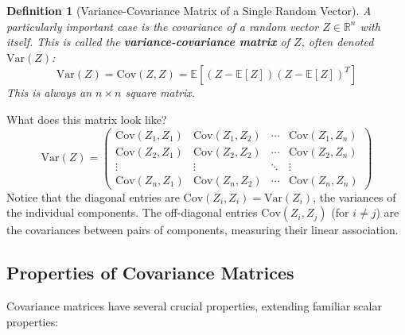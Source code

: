 \documentclass[11pt]{article}
\newtheorem{definition}[theorem]{Definition}
\theoremstyle{definition}
\newcommand{\R}{\mathbb{R}} %
\newcommand{\E}{\mathbb{E}} %
\newcommand{\Var}{\mathrm{Var}} %
\newcommand{\Cov}{\mathrm{Cov}} %
\newcommand{\T}{^T} %
\begin{document}
\begin{definition}[Variance-Covariance Matrix of a Single Random Vector]
\label{def:varcov_one_vector}
A particularly important case is the covariance of a random vector $Z \in \R^n$ with itself. This is called the \textbf{variance-covariance matrix} of $Z$, often denoted $\Var(Z)$:
\[
\Var(Z) = \Cov(Z, Z) = \E\left[ (Z - \E[Z]) (Z - \E[Z])\T \right]
\]
This is always an $n \times n$ square matrix.
\end{definition}

What does this matrix look like?
\[
\Var(Z) = \begin{pmatrix}
\Cov(Z_1, Z_1) & \Cov(Z_1, Z_2) & \cdots & \Cov(Z_1, Z_n) \\
\Cov(Z_2, Z_1) & \Cov(Z_2, Z_2) & \cdots & \Cov(Z_2, Z_n) \\
\vdots & \vdots & \ddots & \vdots \\
\Cov(Z_n, Z_1) & \Cov(Z_n, Z_2) & \cdots & \Cov(Z_n, Z_n)
\end{pmatrix}
\]
Notice that the diagonal entries are $\Cov(Z_i, Z_i) = \Var(Z_i)$, the variances of the individual components. The off-diagonal entries $\Cov(Z_i, Z_j)$ (for $i \neq j$) are the covariances between pairs of components, measuring their linear association.

\subsection{Properties of Covariance Matrices}
\label{subsec:cov_properties}

Covariance matrices have several crucial properties, extending familiar scalar properties:
\end{document}
